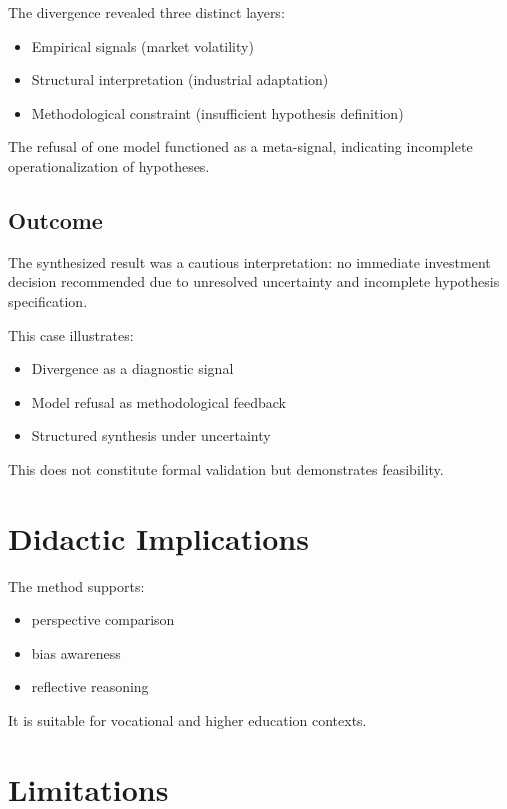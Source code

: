 \documentclass[11pt]{article}
\begin{document}
The divergence revealed three distinct layers:

\begin{itemize}
\item Empirical signals (market volatility)
\item Structural interpretation (industrial adaptation)
\item Methodological constraint (insufficient hypothesis definition)
\end{itemize}

The refusal of one model functioned as a meta-signal, indicating incomplete operationalization of hypotheses.

\subsection{Outcome}

The synthesized result was a cautious interpretation:
no immediate investment decision recommended due to unresolved uncertainty and incomplete hypothesis specification.

This case illustrates:

\begin{itemize}
\item Divergence as a diagnostic signal
\item Model refusal as methodological feedback
\item Structured synthesis under uncertainty
\end{itemize}

This does not constitute formal validation but demonstrates feasibility.

\section{Didactic Implications}

The method supports:

\begin{itemize}
\item perspective comparison
\item bias awareness
\item reflective reasoning
\end{itemize}

It is suitable for vocational and higher education contexts.

\section{Limitations}
\end{document}
